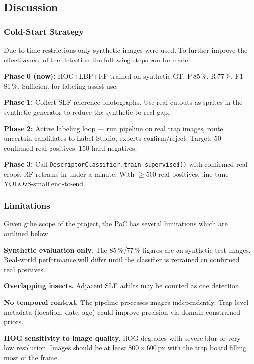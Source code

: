 \documentclass[11pt, a4paper]{article}
\newcommand{\code}[1]{\texttt{\small\color{darkgreen}#1}}
\begin{document}
\subsection{Discussion}

\subsubsection{Cold-Start Strategy}
Due to time restrictions only synthetic images were used. To further improve the effectiveness of 
the detection the following steps can be made:

\textbf{Phase 0 (now):} HOG+LBP+RF trained on synthetic GT. P\,85\,\%,
R\,77\,\%, F1\,81\,\%. Sufficient for labeling-assist use.

\textbf{Phase 1:} Collect SLF reference photographs. Use real cutouts as sprites in the synthetic
generator to reduce the synthetic-to-real gap.

\textbf{Phase 2:} Active labeling loop --- run pipeline on real trap images,
route uncertain candidates to Label Studio, experts confirm/reject.
Target: 50 confirmed real positives, 150 hard negatives.

\textbf{Phase 3:} Call \code{DescriptorClassifier.train\_supervised()} with
confirmed real crops. RF retrains in under a minute. With $\geq$500 real
positives, fine-tune YOLOv8-small end-to-end.

\subsubsection{Limitations}
Given gthe scope of the project, the PoC has several limitations which are outlined below.

\textbf{Synthetic evaluation only.}
The 85\,\%/77\,\% figures are on synthetic test images. Real-world performance
will differ until the classifier is retrained on confirmed real positives.

\textbf{Overlapping insects.}
Adjacent SLF adults may be counted as one detection. 

\textbf{No temporal context.}
The pipeline processes images independently. Trap-level metadata (location,
date, age) could improve precision via domain-constrained priors.

\textbf{HOG sensitivity to image quality.}
HOG degrades with severe blur or very low resolution. Images should be at
least 800\,$\times$\,600\,px with the trap board filling most of the frame.
\end{document}

